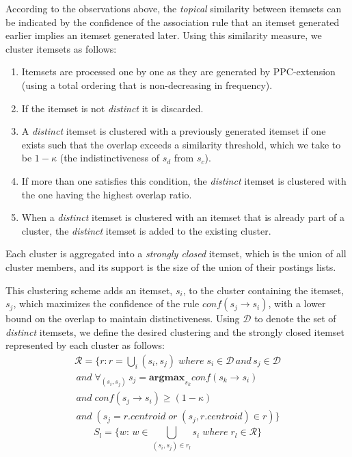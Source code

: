 \documentclass[letterpaper,12pt,titlepage,oneside,final]{book}
\begin{document}
According to the observations above, 
the \emph{topical} similarity between itemsets
can be indicated by
the confidence of 
the association rule that
an itemset generated earlier implies 
an itemset generated later.
Using this similarity measure,
we cluster itemsets as follows:
\begin{enumerate}
\item Itemsets are processed one by one as they are generated by 
PPC-extension 
(using a total ordering that is non-decreasing in frequency).
\item If the itemset is not \emph{distinct} it is discarded.
\item A \emph{distinct} itemset is clustered with 
a previously generated itemset if one exists 
such that the overlap exceeds a similarity threshold,
which we take to be $1-\kappa$ (the indistinctiveness of $s_d$ from $s_c$).
\item If more than one satisfies this condition,
the  \emph{distinct} itemset is clustered with the one having the highest
overlap ratio.
\item When  a \emph{distinct} itemset is clustered with an itemset that is already
part of a cluster, the \emph{distinct} itemset is added to the existing cluster.
\end{enumerate}
Each cluster is aggregated into 
a \emph{strongly closed} itemset, 
which is the union of all cluster members,
and its support is the size of the union of their postings lists.

This clustering scheme adds an itemset, $s_i$, to the cluster
containing the itemset, $s_j$, which 
maximizes the confidence of the rule $conf(s_j \rightarrow s_i)$,
with a lower bound on the overlap to maintain distinctiveness. 
Using $\mathcal{D}$ to denote the set of \emph{distinct} itemsets,  
we define the  desired clustering  and the strongly closed itemset
represented by each cluster as follows:
\begin{align*}\label{eq:strongClosedFormal}
\mathcal{R} = \{r: r = \bigcup_i{(s_i, s_j)}\; where\; s_i \in \mathcal{D} \, and \, s_j \in \mathcal{D} 
\\\,and\; \forall_{(s_i,s_j)} \, s_j = \textbf{argmax}_{s_k} conf(s_k \rightarrow s_i) \\\,and \;conf(s_j \rightarrow s_i) \ge (1-\kappa)
\\\, and\;( s_j = r.centroid\; or \; (s_j, r.centroid) \in r )\}
\end{align*}
\begin{equation}S_l = \{w:\, w \in \bigcup_{(s_i, s_j) \in r_l}{s_i} \; where \; r_l \in \mathcal{R}\}\end{equation}
\end{document}
